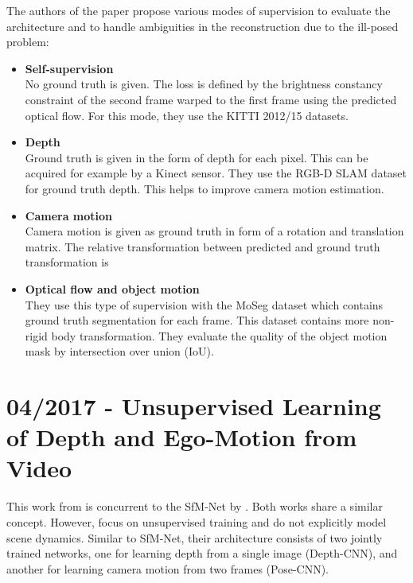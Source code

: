		The authors of the paper propose various modes of supervision to evaluate the architecture and to handle ambiguities in the reconstruction due to the ill-posed problem:
		\begin{itemize}
		\item \textbf{Self-supervision}
			\\
			No ground truth is given.
			The loss is defined by the brightness constancy constraint of the second frame warped to the first frame using the predicted optical flow.
			For this mode, they use the {KITTI} 2012/15 datasets.
		\item \textbf{Depth}
			\\
			Ground truth is given in the form of depth for each pixel.
			This can be acquired for example by a Kinect sensor.
			They use the {RGB-D SLAM} dataset for ground truth depth.
			This helps to improve camera motion estimation. 
		\item \textbf{Camera motion}
			\\
			Camera motion is given as ground truth in form of a rotation and translation matrix.
			The relative transformation between predicted and ground truth transformation is 
		\item \textbf{Optical flow and object motion}
			\\
			They use this type of supervision with the MoSeg dataset which contains ground truth segmentation for each frame.
			This dataset contains more non-rigid body transformation.
			They evaluate the quality of the object motion mask by intersection over union (IoU).
		\end{itemize}
		
	\section{04/2017 - Unsupervised Learning of Depth and Ego-Motion from Video}
		
		This work from \cite{zhou2017unsupervised} is concurrent to the SfM-Net by \cite{SFMNET}.
		Both works share a similar concept.
		However, \cite{zhou2017unsupervised} focus on unsupervised training and do not explicitly model scene dynamics.
		Similar to SfM-Net, their architecture consists of two jointly trained networks, one for learning depth from a single image (Depth-CNN), and another for learning camera motion from two frames (Pose-CNN).
		
